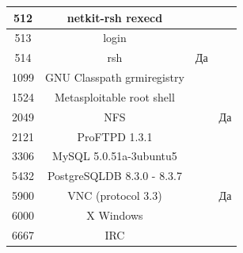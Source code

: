 \begin{table}[H]
{\begin{tabular}{cccl}
			\multicolumn{1}{|c|}{512}   & \multicolumn{1}{c|}{netkit-rsh rexecd}                           & \multicolumn{1}{c|}{}                   & \multicolumn{1}{l|}{}                  \\ \hline
			\multicolumn{1}{|c|}{513}   & \multicolumn{1}{c|}{login}                                       & \multicolumn{1}{c|}{}                   & \multicolumn{1}{l|}{}                  \\ \hline
			\multicolumn{1}{|c|}{514}   & \multicolumn{1}{c|}{rsh}                                         & \multicolumn{1}{c|}{Да}                 & \multicolumn{1}{l|}{}                  \\ \hline
			\multicolumn{1}{|c|}{1099}  & \multicolumn{1}{c|}{GNU Classpath grmiregistry}                  & \multicolumn{1}{c|}{}                   & \multicolumn{1}{l|}{}                  \\ \hline
			\multicolumn{1}{|c|}{1524}  & \multicolumn{1}{c|}{Metasploitable root shell}                   & \multicolumn{1}{c|}{}                   & \multicolumn{1}{l|}{}                  \\ \hline
			\multicolumn{1}{|c|}{2049}  & \multicolumn{1}{c|}{NFS}                                         & \multicolumn{1}{c|}{}                   & \multicolumn{1}{l|}{Да}                \\ \hline
			\multicolumn{1}{|c|}{2121}  & \multicolumn{1}{c|}{ProFTPD 1.3.1}                               & \multicolumn{1}{c|}{}                   & \multicolumn{1}{l|}{}                  \\ \hline
			\multicolumn{1}{|c|}{3306}  & \multicolumn{1}{c|}{MySQL 5.0.51a-3ubuntu5}                      & \multicolumn{1}{c|}{}                   & \multicolumn{1}{l|}{}                  \\ \hline
			\multicolumn{1}{|c|}{5432}  & \multicolumn{1}{c|}{PostgreSQLDB 8.3.0 - 8.3.7}                  & \multicolumn{1}{c|}{}                   & \multicolumn{1}{l|}{}                  \\ \hline
			\multicolumn{1}{|c|}{5900}  & \multicolumn{1}{c|}{VNC (protocol 3.3)}                          & \multicolumn{1}{c|}{}                   & \multicolumn{1}{l|}{Да}                \\ \hline
			\multicolumn{1}{|c|}{6000}  & \multicolumn{1}{c|}{X Windows}                                   & \multicolumn{1}{c|}{}                   & \multicolumn{1}{l|}{}                  \\ \hline
			\multicolumn{1}{|c|}{6667}  & \multicolumn{1}{c|}{IRC}                                         & \multicolumn{1}{c|}{}                   & \multicolumn{1}{l|}{}                  \\ \hline

\end{tabular}}
\end{table}
